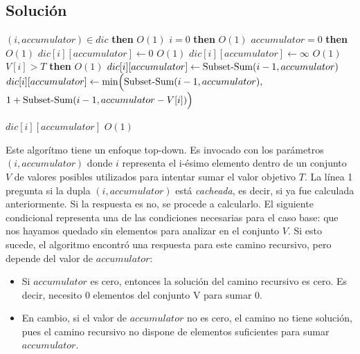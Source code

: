 \subsection{Solución}
\begin{center}
	\begin{minipage}{.8\textwidth}
		\begin{codebox}
				\li \If $(i, accumulator) \in dic$ \textbf{then}				\RComment $O(1)$
				\li \Then
					\If $i = 0$ \textbf{then}									\RComment $O(1)$
					\li \Then
						\If $accumulator = 0$ \textbf{then}						\RComment $O(1)$
						\li \Then
							 $dic[i][accumulator] \leftarrow 0$ 				\RComment $O(1)$
						\li \Else
							\li $dic[i][accumulator] \leftarrow \infty$ 		\RComment $O(1)$
							\li
						\End
					\Else
						\li \If $V[i] > T$ \textbf{then}						\RComment $O(1)$
						\li \Then
							 $dic[i][accumulator] \leftarrow \func{Subset-Sum}(i - 1, accumulator)$
						\li \Else
							\li $dic[i][accumulator] \leftarrow \func{min}\Big(\func{Subset-Sum}(i - 1, accumulator),$
							\Indentmore \li $1 + \func{Subset-Sum}(i - 1, accumulator - V[i])\Big)$
						\End
					\End
				\End

				\zi
				\li \Return $dic[i][accumulator]$								\RComment $O(1)$
			\End
		\end{codebox}

		\label{fig:alg-prodin}
	\end{minipage}
\end{center}
Este algorítmo tiene un enfoque top-down. Es invocado con los parámetros $(i, accumulator)$ donde $i$ representa el i-ésimo elemento dentro de un conjunto $V$ de valores posibles utilizados para intentar sumar el valor objetivo $T$. La línea 1 pregunta si la dupla $(i, accumulator)$ está \textit{cacheada}, es decir, si ya fue calculada anteriormente. Si la respuesta es no, se procede a calcularlo. El siguiente condicional representa una de las condiciones necesarias para el caso base: que nos hayamos quedado sin elementos para analizar en el conjunto $V$. Si esto sucede, el algoritmo encontró una respuesta para este camino recursivo, pero depende del valor de $accumulator$:

\begin{itemize}
	\item Si $accumulator$ es cero, entonces la solución del camino recursivo es cero. Es decir, necesito 0 elementos del conjunto V para sumar 0.
	\item En cambio, si el valor de $accumulator$ no es cero, el camino no tiene solución, pues el camino recursivo no dispone de elementos suficientes para sumar $accumulator$.
\end{itemize}

